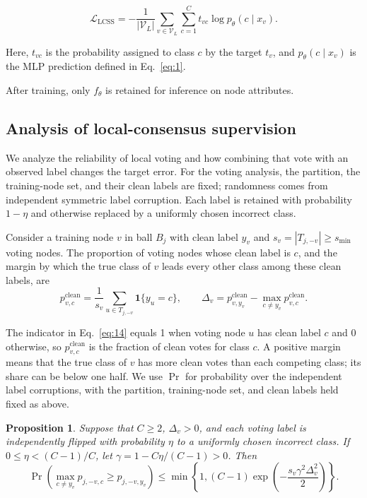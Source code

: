 \documentclass[10pt,letterpaper,nopreprintline]{elsarticle}
\theoremstyle{plain}
\newtheorem{proposition}{Proposition}
\begin{document}
\begin{equation}\label{eq:13}
\mathcal{L}_{\mathrm{LCSS}} = - \frac{1}{|\mathcal{V}_{L}|}\sum_{v \in \mathcal{V}_{L}}{\sum_{c = 1}^{C}t_{vc}}\log p_{\theta}(c \mid x_{v}).
\end{equation}

Here, \(t_{vc}\) is the probability assigned to class \(c\) by the target \(t_{v}\), and \(p_{\theta}\left( c \mid x_{v} \right)\) is the MLP prediction defined in Eq.~\eqref{eq:1}.

After training, only \(f_{\theta}\) is retained for inference on node attributes.

\subsection{Analysis of local-consensus supervision}\label{sec:3.4}

We analyze the reliability of local voting and how combining that vote with an observed label changes the target error. For the voting analysis, the partition, the training-node set, and their clean labels are fixed; randomness comes from independent symmetric label corruption. Each label is retained with probability \(1-\eta\) and otherwise replaced by a uniformly chosen incorrect class.

Consider a training node \(v\) in ball \(B_j\) with clean label \(y_v\) and \(s_v=|T_{j,-v}|\geq s_{\min}\) voting nodes. The proportion of voting nodes whose clean label is \(c\), and the margin by which the true class of \(v\) leads every other class among these clean labels, are
\begin{equation}\label{eq:14}
p^{\mathrm{clean}}_{v,c}=\frac{1}{s_v}\sum_{u\in T_{j,-v}}\mathbf{1}\{y_u=c\},
\qquad
\Delta_v=p^{\mathrm{clean}}_{v,y_v}-\max_{c\ne y_v}p^{\mathrm{clean}}_{v,c}.
\end{equation}

The indicator in Eq.~\eqref{eq:14} equals 1 when voting node \(u\) has clean label \(c\) and 0 otherwise, so \(p^{\mathrm{clean}}_{v,c}\) is the fraction of clean votes for class \(c\). A positive margin means that the true class of \(v\) has more clean votes than each competing class; its share can be below one half. We use \(\Pr\) for probability over the independent label corruptions, with the partition, training-node set, and clean labels held fixed as above.

\begin{proposition}\label{prop:local_vote}
Suppose that \(C\geq2\), \(\Delta_v>0\), and each voting label is independently flipped with probability \(\eta\) to a uniformly chosen incorrect class. If \(0\leq\eta<(C-1)/C\), let \(\gamma=1-C\eta/(C-1)>0\). Then
\begin{equation}\label{eq:15}
\Pr\!\left(\max_{c\ne y_v}p_{j,-v,c}\geq p_{j,-v,y_v}\right)
\leq \min\!\left\{1,(C-1)\exp\!\left(-\frac{s_v\gamma^2\Delta_v^2}{2}\right)\right\}.
\end{equation}
\end{proposition}
\end{document}
